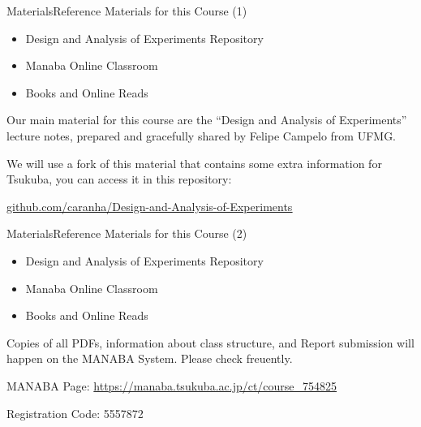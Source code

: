 \documentclass[t]{beamer}
\begin{document}
\begin{ftst}
  {Materials}{Reference Materials for this Course (1)}
  \begin{itemize}
  \item \alert{Design and Analysis of Experiments Repository}
  \item Manaba Online Classroom
  \item Books and Online Reads
  \end{itemize}

  \begin{block}{}
    Our main material for this course are the ``Design and Analysis of
    Experiments'' lecture notes, prepared and gracefully shared by
    Felipe Campelo from UFMG.

    \vone

    We will use a fork of this material that contains some extra information
    for Tsukuba, you can access it in this repository:

    \vone
    
    {\color{blue}\underline{{\small \href{https://github.com/caranha/Design-and-Analysis-of-Experiments}{github.com/caranha/Design-and-Analysis-of-Experiments}}}}
  \end{block}
  
\end{ftst}

\begin{ftst}
  {Materials}{Reference Materials for this Course (2)}
  \begin{itemize}
  \item Design and Analysis of Experiments Repository
  \item \alert{Manaba Online Classroom}
  \item Books and Online Reads
  \end{itemize}

  \begin{block}{}
    Copies of all PDFs, information about class structure, and Report
    submission will happen on the MANABA System. Please check
    freuently.

    \vone

    MANABA Page: \url{https://manaba.tsukuba.ac.jp/ct/course_754825}

    \vone
    
    Registration Code: \alert{5557872}
    
  \end{block}
\end{ftst}
\end{document}
